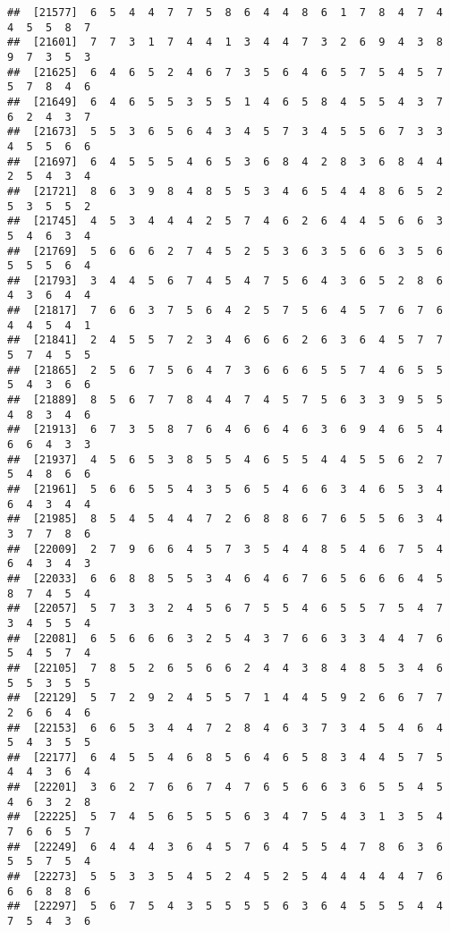 \documentclass[
]{book}
\begin{document}
\begin{verbatim}
##  [21577]  6  5  4  4  7  7  5  8  6  4  4  8  6  1  7  8  4  7  4  4  5  5  8  7
##  [21601]  7  7  3  1  7  4  4  1  3  4  4  7  3  2  6  9  4  3  8  9  7  3  5  3
##  [21625]  6  4  6  5  2  4  6  7  3  5  6  4  6  5  7  5  4  5  7  5  7  8  4  6
##  [21649]  6  4  6  5  5  3  5  5  1  4  6  5  8  4  5  5  4  3  7  6  2  4  3  7
##  [21673]  5  5  3  6  5  6  4  3  4  5  7  3  4  5  5  6  7  3  3  4  5  5  6  6
##  [21697]  6  4  5  5  5  4  6  5  3  6  8  4  2  8  3  6  8  4  4  2  5  4  3  4
##  [21721]  8  6  3  9  8  4  8  5  5  3  4  6  5  4  4  8  6  5  2  5  3  5  5  2
##  [21745]  4  5  3  4  4  4  2  5  7  4  6  2  6  4  4  5  6  6  3  5  4  6  3  4
##  [21769]  5  6  6  6  2  7  4  5  2  5  3  6  3  5  6  6  3  5  6  5  5  5  6  4
##  [21793]  3  4  4  5  6  7  4  5  4  7  5  6  4  3  6  5  2  8  6  4  3  6  4  4
##  [21817]  7  6  6  3  7  5  6  4  2  5  7  5  6  4  5  7  6  7  6  4  4  5  4  1
##  [21841]  2  4  5  5  7  2  3  4  6  6  6  2  6  3  6  4  5  7  7  5  7  4  5  5
##  [21865]  2  5  6  7  5  6  4  7  3  6  6  6  5  5  7  4  6  5  5  5  4  3  6  6
##  [21889]  8  5  6  7  7  8  4  4  7  4  5  7  5  6  3  3  9  5  5  4  8  3  4  6
##  [21913]  6  7  3  5  8  7  6  4  6  6  4  6  3  6  9  4  6  5  4  6  6  4  3  3
##  [21937]  4  5  6  5  3  8  5  5  4  6  5  5  4  4  5  5  6  2  7  5  4  8  6  6
##  [21961]  5  6  6  5  5  4  3  5  6  5  4  6  6  3  4  6  5  3  4  6  4  3  4  4
##  [21985]  8  5  4  5  4  4  7  2  6  8  8  6  7  6  5  5  6  3  4  3  7  7  8  6
##  [22009]  2  7  9  6  6  4  5  7  3  5  4  4  8  5  4  6  7  5  4  6  4  3  4  3
##  [22033]  6  6  8  8  5  5  3  4  6  4  6  7  6  5  6  6  6  4  5  8  7  4  5  4
##  [22057]  5  7  3  3  2  4  5  6  7  5  5  4  6  5  5  7  5  4  7  3  4  5  5  4
##  [22081]  6  5  6  6  6  3  2  5  4  3  7  6  6  3  3  4  4  7  6  5  4  5  7  4
##  [22105]  7  8  5  2  6  5  6  6  2  4  4  3  8  4  8  5  3  4  6  5  5  3  5  5
##  [22129]  5  7  2  9  2  4  5  5  7  1  4  4  5  9  2  6  6  7  7  2  6  6  4  6
##  [22153]  6  6  5  3  4  4  7  2  8  4  6  3  7  3  4  5  4  6  4  5  4  3  5  5
##  [22177]  6  4  5  5  4  6  8  5  6  4  6  5  8  3  4  4  5  7  5  4  4  3  6  4
##  [22201]  3  6  2  7  6  6  7  4  7  6  5  6  6  3  6  5  5  4  5  4  6  3  2  8
##  [22225]  5  7  4  5  6  5  5  5  6  3  4  7  5  4  3  1  3  5  4  7  6  6  5  7
##  [22249]  6  4  4  4  3  6  4  5  7  6  4  5  5  4  7  8  6  3  6  5  5  7  5  4
##  [22273]  5  5  3  3  5  4  5  2  4  5  2  5  4  4  4  4  4  7  6  6  6  8  8  6
##  [22297]  5  6  7  5  4  3  5  5  5  5  6  3  6  4  5  5  5  4  4  7  5  4  3  6

\end{verbatim}
\end{document}
